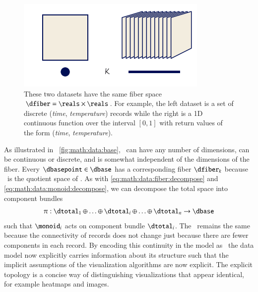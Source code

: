 \documentclass[journal]{vgtc}                %
\begin{document}
  \begin{figure}[htb]
    \centering %
    \includegraphics[width=\columnwidth]{base.png}
    \caption{These two datasets have the same fiber space $\dfiber=\reals\times\reals$. For example, the left dataset is a set of discrete (\textit{time}, \textit{temperature}) records while the right is a 1D continuous function over the interval $\left[0,1\right]$ with return values of the form (\textit{time}, \textit{temperature}).}
    \label{fig:math:data:base}
   \end{figure}
 As illustrated in ~\autoref{fig:math:data:base}, \dbase\ can have any number of dimensions, can be continuous or discrete, and is somewhat independent of the dimensions of the fiber. Every $\dbasepoint \in \dbase$ has a corresponding fiber $\dfiber_k$ because \dbase\ is the quotient space\cite{QuotientSpaceTopology2020,aurouxMath131Introduction} of \dtotal. As with \autoref{eq:math:data:fiber:decompose} and \autoref{eq:math:data:monoid:decompose}, we can decompose the total space into component bundles
 \begin{equation}\label{eq:math:data:base:decompose}
     \pi:\dtotal_1\oplus\ldots\oplus \dtotal_i \oplus\ldots \oplus \dtotal_n \rightarrow \dbase
 \end{equation}
 such that \(\monoid_{i}\) acts on component bundle \(\dtotal_i\). The \dbase\ remains the same because the connectivity of records does not change just because there are fewer components in each record. By encoding this continuity in the model as \dbase\, the data model now explicitly carries information about its structure such that the implicit assumptions of the visualization algorithms are now explicit. The explicit topology is a concise way of distinguishing visualizations that appear identical, for example heatmaps and images.  
\end{document}

